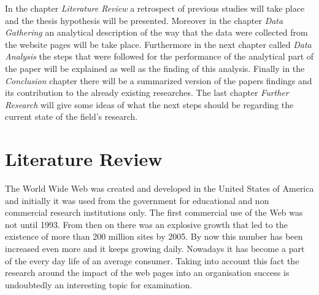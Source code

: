 \documentclass{book}
\begin{document}
In the chapter \textit{Literature Review} a retrospect of previous studies will take place and the thesis hypothesis will be presented. Moreover in the chapter \textit{Data Gathering} an analytical description of the way that the data were collected from the website pages will be take place. Furthermore in the next chapter called \textit{Data Analysis} the steps that were followed for the performance of the analytical part of the paper will be explained as well as the finding of this analysis. Finally in the \textit{Conclusion} chapter there will be a summarized version of the papers findings and its contribution to the already existing researches. The last chapter \textit{Further Research} will give some ideas of what the next steps should be regarding the current state of the field's research.
\newpage
\chapter{Literature Review }
The World Wide Web was created and developed in the United States of America and initially it was used from the government for educational and non commercial research institutions only. The first commercial use of the Web was not until 1993.\cite{key1} From then on there was an explosive growth that led to the existence of more than 200 million sites by 2005.\cite{key3} By now this number has been increased even more and it keeps growing daily. Nowadays it has become a part of the every day life of an average consumer. Taking into account this fact the research around the impact of the web pages into an organisation success is undoubtedly an interesting topic for examination.
\end{document}
